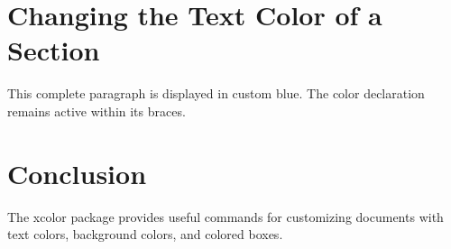 \documentclass[12pt,a4paper]{article}
\begin{document}

\bigskip


\section{Changing the Text Color of a Section}

{\color{myblue}
This complete paragraph is displayed in custom blue.
The color declaration remains active within its braces.
}

\section{Conclusion}

The xcolor package provides useful commands for
customizing documents with text colors, background
colors, and colored boxes.
\end{document}
